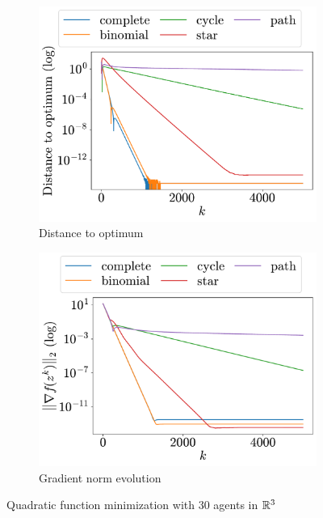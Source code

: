 \documentclass[a4paper,11pt,oneside]{book}
\begin{document}
\begin{figure}[H]
      \centering
      \begin{subfigure}[t]{0.48\linewidth}
            \centering
            \includegraphics[width=\linewidth]{./figs/quadratic/30_3/distance.pdf} 
            \caption{Distance to optimum}
      \end{subfigure}
      \hfill
      \begin{subfigure}[t]{0.48\linewidth}
            \centering
            \includegraphics[width=\linewidth]{./figs/quadratic/30_3/gradient.pdf} 
            \caption{Gradient norm evolution}
      \end{subfigure}
      \caption{Quadratic function minimization with $30$ agents in ${\mathbb{R}}^{3}$}
      \label{fig:quadratic_30_3}
\end{figure}
\end{document}
